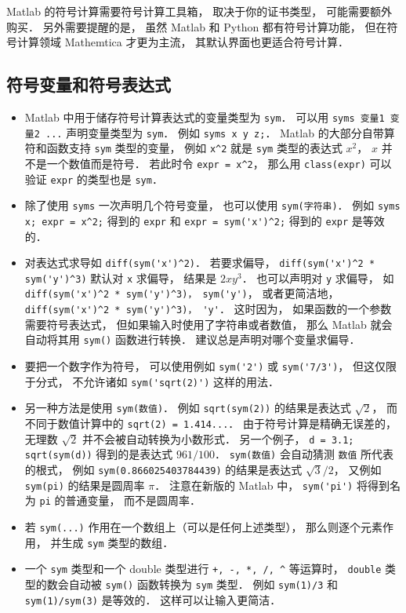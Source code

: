 

Matlab 的符号计算需要符号计算工具箱， 取决于你的证书类型， 可能需要额外购买． 另外需要提醒的是， 虽然 Matlab 和 Python 都有符号计算功能， 但在符号计算领域 Mathemtica 才更为主流， 其默认界面也更适合符号计算．

\subsection{符号变量和符号表达式}
\begin{itemize}
\item Matlab 中用于储存符号计算表达式的变量类型为 \verb|sym|． 可以用 \verb|syms 变量1 变量2 ...| 声明变量类型为 \verb|sym|． 例如 \verb|syms x y z;|． Matlab 的大部分自带算符和函数支持 \verb|sym| 类型的变量， 例如 \verb|x^2| 就是 \verb|sym| 类型的表达式 $x^2$， $x$ 并不是一个数值而是符号． 若此时令 \verb|expr = x^2|， 那么用 \verb|class(expr)| 可以验证 \verb|expr| 的类型也是 \verb|sym|．

\item 除了使用 \verb|syms| 一次声明几个符号变量， 也可以使用 \verb|sym(字符串)|． 例如 \verb|syms x; expr = x^2;| 得到的 \verb|expr| 和 \verb|expr = sym('x')^2;| 得到的 \verb|expr| 是等效的．

\item  对表达式求导如 \verb|diff(sym('x')^2)|． 若要求偏导， \verb|diff(sym('x')^2 * sym('y')^3)| 默认对 \verb|x| 求偏导， 结果是 $2x y^3$． 也可以声明对 \verb|y| 求偏导， 如 \verb|diff(sym('x')^2 * sym('y')^3)， sym('y')|， 或者更简洁地， \verb|diff(sym('x')^2 * sym('y')^3)， 'y'|． 这时因为， 如果函数的一个参数需要符号表达式， 但如果输入时使用了字符串或者数值， 那么 Matlab 就会自动将其用 \verb|sym()| 函数进行转换． 建议总是声明对哪个变量求偏导．

\item  要把一个数字作为符号， 可以使用例如 \verb|sym('2')| 或 \verb|sym('7/3')|， 但这仅限于分式， 不允许诸如 \verb|sym('sqrt(2)')| 这样的用法．

\item 另一种方法是使用 \verb|sym(数值)|． 例如 \verb|sqrt(sym(2))| 的结果是表达式 $\sqrt 2$， 而不同于数值计算中的 \verb|sqrt(2) = 1.414...|． 由于符号计算是精确无误差的， 无理数 $\sqrt{2}$ 并不会被自动转换为小数形式． 另一个例子， \verb|d = 3.1; sqrt(sym(d))| 得到的是表达式 $961/100$． \verb|sym(数值)| 会自动猜测 \verb|数值| 所代表的根式， 例如 \verb|sym(0.866025403784439)| 的结果是表达式 $\sqrt{3}/2$， 又例如 \verb|sym(pi)| 的结果是圆周率 $\pi$． 注意在新版的 Matlab 中， \verb|sym('pi')| 将得到名为 \verb|pi| 的普通变量， 而不是圆周率．

\item 若 \verb|sym(...)| 作用在一个数组上（可以是任何上述类型）， 那么则逐个元素作用， 并生成 \verb|sym| 类型的数组．

\item 一个 \verb|sym| 类型和一个 double 类型进行 \verb|+, -, *, /, ^| 等运算时， \verb|double| 类型的数会自动被 \verb|sym()| 函数转换为 \verb|sym| 类型． 例如 \verb|sym(1)/3| 和 \verb|sym(1)/sym(3)| 是等效的． 这样可以让输入更简洁．
\end{itemize}

